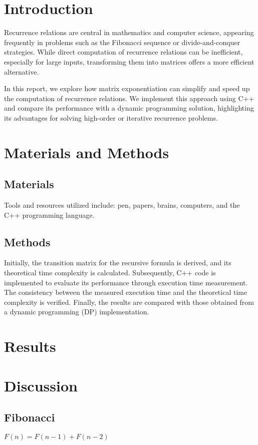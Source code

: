 \section{Introduction}
Recurrence relations are central in mathematics and computer science, appearing frequently in problems such as the Fibonacci sequence or divide-and-conquer strategies. While direct computation of recurrence relations can be inefficient, especially for large inputs, transforming them into matrices offers a more efficient alternative.

In this report, we explore how matrix exponentiation can simplify and speed up the computation of recurrence relations. We implement this approach using C++ and compare its performance with a dynamic programming solution, highlighting its advantages for solving high-order or iterative recurrence problems.

\section{Materials and Methods}
\subsection{Materials}
Tools and resources utilized include: pen, papers, brains, computers, and the C++ programming language.
\subsection{Methods}
Initially, the transition matrix for the recursive formula is derived, and its theoretical time complexity is calculated. Subsequently, C++ code is implemented to evaluate its performance through execution time measurement. The consistency between the measured execution time and the theoretical time complexity is verified. Finally, the results are compared with those obtained from a dynamic programming (DP) implementation.

\section{Results}

\section{Discussion}
\subsection{Fibonacci} 
$F(n) = F(n - 1) + F(n - 2)$

